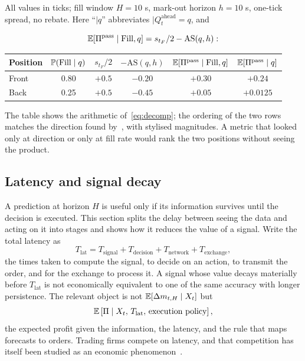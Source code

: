 \begin{example}
\label{ex:as}
All values in ticks; fill window $H = 10$ s, mark-out horizon $h = 10$ s, one-tick spread, no
rebate. Here ``$\mid q$'' abbreviates $\mid Q^{\text{ahead}}_t = q$, and

\[
  \mathbb{E}[\Pi^{\text{pass}} \mid \mathrm{Fill}, q] = s_{t_F}/2 - \mathrm{AS}(q,h):
\]

\begin{center}\small
\begin{tabular}{lccccc}
\toprule
Position & $\mathbb{P}(\mathrm{Fill} \mid q)$ & $s_{t_F}/2$ & $-\mathrm{AS}(q,h)$ & $\mathbb{E}[\Pi^{\text{pass}} \mid \mathrm{Fill}, q]$ & $\mathbb{E}[\Pi^{\text{pass}} \mid q]$ \\
\midrule
Front & 0.80 & $+0.5$ & $-0.20$ & $+0.30$ & $+0.24$ \\
Back  & 0.25 & $+0.5$ & $-0.45$ & $+0.05$ & $+0.0125$ \\
\bottomrule
\end{tabular}
\end{center}
The table shows the arithmetic of~\eqref{eq:decomp}; the ordering of the two rows matches the
direction found by~\citet{moallemi2017}, with stylised magnitudes. A metric that looked
only at direction or only at fill rate would rank the two positions without seeing the product.
\end{example}

\subsection{Latency and signal decay}
\label{sec:latency}

A prediction at horizon $H$ is useful only if its information survives until the decision is
executed. This section splits the delay between seeing the data and acting on it into stages and shows how it
reduces the value of a signal. Write the total latency as
\begin{equation}
  T_{\text{lat}} = T_{\text{signal}} + T_{\text{decision}} + T_{\text{network}} + T_{\text{exchange}},
\end{equation}
the times taken to compute the signal, to decide on an action, to transmit the order, and for the
exchange to process it.
A signal whose value decays materially before $T_{\text{lat}}$ is not economically equivalent to
one of the same accuracy with longer persistence. The relevant object is not
$\mathbb{E}[\Delta m_{t,H} \mid X_t]$ but
\begin{equation}
  \mathbb{E}\left[\Pi \mid X_t,\, T_{\text{lat}},\, \text{execution policy}\right],
\end{equation}
the expected profit given the information, the latency, and the rule that maps forecasts to orders.
Trading firms compete on latency, and that competition has itself been studied as an economic
phenomenon~\citep{budish2015,hasbrouck2013}.

